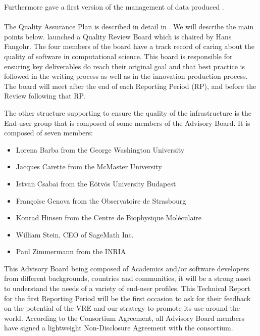 \documentclass{deliverablereport}
\begin{document}
Furthermore  gave a first version of the management of data produced \ODK.


\paragraph{}


The Quality Assurance Plan is described in detail in . We will describe the main points below.
 launched a Quality Review Board which is chaired by Hans Fangohr. The four members of the board have a track record of caring about the quality of software in computational science. This board is responsible for ensuring key deliverables do reach their original goal and that best practice is followed in the writing process as well as in the innovation production process.
The board will meet after the end of each Reporting Period (RP), and before the Review following that RP.

The other structure supporting \ODK to ensure the quality of the
infrastructure is the End-user group that is composed of some members
of the Advisory Board. It is composed of seven members:

\begin{itemize}
\item{Lorena Barba from the George Washington University}
\item{Jacques Carette from the McMaster University}
\item{Istvan Csabai from the Eötvös University Budapest}
\item{Françoise Genova from the Observatoire de Strasbourg}
\item{Konrad Hinsen from the Centre de Biophysique Moléculaire}
\item{William Stein, CEO of SageMath Inc.}
\item{Paul Zimmermann from the INRIA}
\end{itemize}

This Advisory Board being composed of Academics and/or software
developers from different backgrounds, countries and communities, it
will be a strong asset to understand the needs of a variety of
end-user profiles. This Technical Report for the first Reporting
Period will be the first occasion to ask for their feedback on the
potential of the VRE and our strategy to promote its use around the
world. According to the Consortium Agreement, all Advisory Board
members have signed a lightweight Non-Disclosure Agreement with the
consortium.
\end{document}
